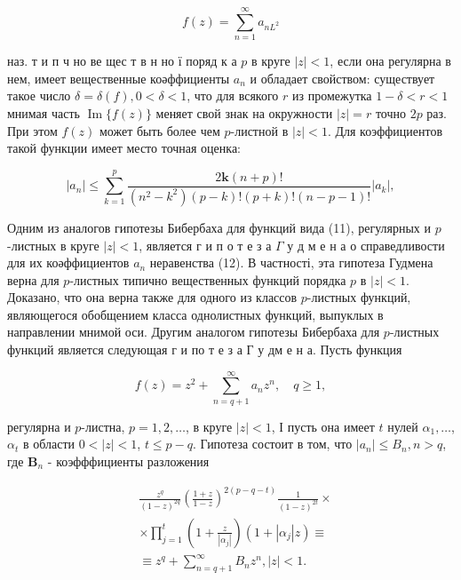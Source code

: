 \documentclass[10pt]{article}
\begin{document}
\[

f(z)=\sum_{n=1}^{\infty} a_{n L^{2}}

\]



наз. т и п ч но ве щес т в н но ї поряд к а $p$ в круге $|z|<1$, если она регулярна в нем, имеет вещественные коәффициенты $a_{n}$ и обладает свойством: существует такое число $\delta=\delta(f), 0<\delta<1$, что для всякого $r$ из промежутка $1-\delta<r<1$ мнимая часть $\operatorname{Im}\{f(z)\}$ меняет свой знак на окружности $|z|=r$ точно $2 p$ раз. При этом $f(z)$ может быть более чем $p$-листной в $|z|<1$. Для коэффициентов такой функции имеет место точная оценка:



\[

\left|a_{n}\right| \leqslant \sum_{k=1}^{p} \frac{2 \boldsymbol{k}(n+p) !}{\left(n^{2}-k^{2}\right)(p-k) !(p+k) !(n-p-1) !}\left|a_{k}\right|,

\]



Одним из аналогов гипотезы Бибербаха для функций вида (11), регулярных и $p$-листных в круге $|z|<1$, является г и п о т е з а $\Gamma$ у д м е н а о справедливости для их коәффициентов $a_{n}$ неравенства (12). В частності, эта гипотеза Гудмена верна для $p$-листных типично вещественных функций порядка $p$ в $|z|<1$. Доказано, что она верна также для одного из классов $p$-листных функций, являющегося обобщением класса однолистных функций, выпуклых в направлении мнимой оси. Другим аналогом гипотезы Бибербаха для $p$-листных функций является следующая г и по т е з а Г у дм е н а. Пусть функция



\[

f(z)=z^{2}+\sum_{n=q+1}^{\infty} a_{n} z^{n}, \quad q \geqslant 1,

\]



регулярна и $p$-листна, $p=1,2, \ldots$, в круге $|z|<1$, І пусть она имеет $t$ нулей $\alpha_{1}, \ldots$, $\alpha_{t}$ в области $0<|z|<1$, $t \leqslant p-q$. Гипотеза состоит в том, что $\left|a_{n}\right| \leqslant B_{n}, n>q$, где $\boldsymbol{B}_{n}$ - коэфффициенты разложения



\[

\begin{aligned}

& \frac{z^{q}}{(1-z)^{2 q}}\left(\frac{1+z}{1-z}\right)^{2(p-q-t)} \frac{1}{(1-z)^{2 t}} \times \\

& \times \prod_{j=1}^{t}\left(1+\frac{z}{\left|\alpha_{j}\right|}\right)\left(1+\left|\alpha_{j}\right| z\right) \equiv \\

& \equiv z^{q}+\sum_{n=q+1}^{\infty} B_{n} z^{n},|z|<1 .

\end{aligned}

\]
\end{document}
